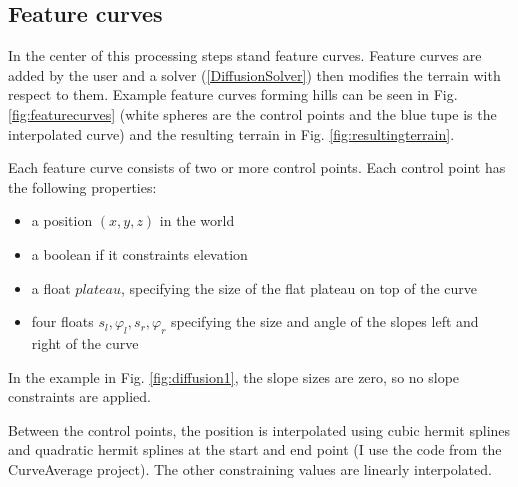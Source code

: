 \documentclass[journal, letterpaper]{IEEEtran}
\begin{document}
\subsection{Feature curves}
In the center of this processing steps stand feature curves. Feature curves are added by the user and a solver (\ref{DiffusionSolver}) then modifies the terrain with respect to them.
Example feature curves forming hills can be seen in Fig. \ref{fig:featurecurves} (white spheres are the control points and the blue tupe is the interpolated curve) and the resulting terrain in Fig. \ref{fig:resultingterrain}.

Each feature curve consists of two or more control points. Each control point has the following properties:
\begin{itemize}
	\item a position $(x,y,z)$ in the world
	\item a boolean if it constraints elevation
	\item a float $plateau$, specifying the size of the flat plateau on top of the curve
	\item four floats $s_l, \varphi_l, s_r, \varphi_r$ specifying the size and angle of the slopes left and right of the curve
\end{itemize}
In the example in Fig. \ref{fig:diffusion1}, the slope sizes are zero, so no slope constraints are applied.

Between the control points, the position is interpolated using cubic hermit splines and quadratic hermit splines at the start and end point (I use the code from the CurveAverage project).
The other constraining values are linearly interpolated. 
\end{document}
